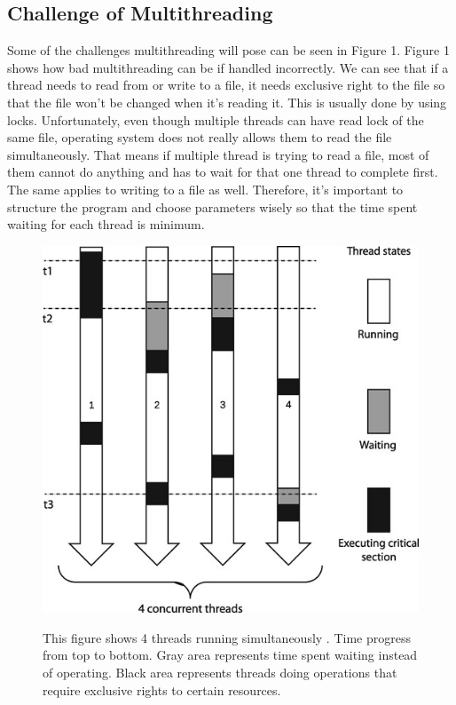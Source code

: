 \documentclass[unnumsec,webpdf,contemporary,large]{oup-authoring-template}
\begin{document}
\subsection{Challenge of Multithreading}
Some of the challenges multithreading will pose can be seen in Figure 1. Figure 1 shows how bad multithreading can be if handled incorrectly. We can see that if a thread needs to read from or write to a file, it needs exclusive right to the file so that the file won't be changed when it's reading it. This is usually done by using locks. Unfortunately, even though multiple threads can have read lock of the same file, operating system does not really allows them to read the file simultaneously. That means if multiple thread is trying to read a file, most of them cannot do anything and has to wait for that one thread to complete first. The same applies to writing to a file as well. Therefore, it's important to structure the program and choose parameters wisely so that the time spent waiting for each thread is minimum. 
\begin{figure}[H]
    \includegraphics[width=\linewidth]{figs/multithread.jpeg}
    \label{fig:multithread}
    \caption{This figure shows 4 threads running simultaneously . Time progress from top to bottom. Gray area represents time spent waiting instead of operating. Black area represents threads doing operations that require exclusive rights to certain resources. ~\cite{intropaper}}
\end{figure}
\end{document}
